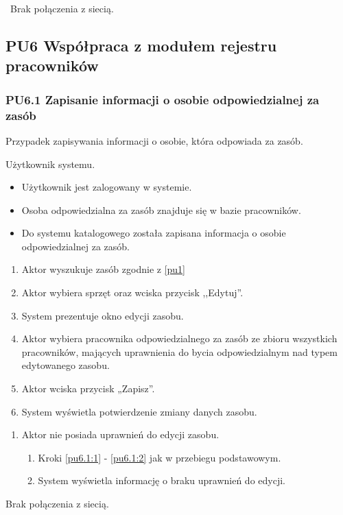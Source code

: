 \
Brak połączenia z siecią.


\subsection{PU6 Współpraca z modułem rejestru pracowników} \label{pu6}
\subsubsection{PU6.1 Zapisanie informacji o osobie odpowiedzialnej za zasób}
\myparagraph{Opis}
Przypadek zapisywania informacji o osobie, która odpowiada za zasób.

Użytkownik systemu.

\begin{itemize}
\item Użytkownik jest zalogowany w systemie.
\item Osoba odpowiedzialna za zasób znajduje się w bazie pracowników.
\end{itemize}

\begin{itemize}
\item Do systemu katalogowego została zapisana informacja o osobie odpowiedzialnej za zasób.
\end{itemize}

\begin{enumerate}
	\item \label{pu6.1:1} Aktor wyszukuje zasób zgodnie z \ref{pu1}
	\item \label{pu6.1:2} Aktor wybiera sprzęt oraz wciska przycisk ,,Edytuj''.
	\item System prezentuje okno edycji zasobu.
	\item Aktor wybiera pracownika odpowiedzialnego za zasób ze zbioru wszystkich pracowników, mających uprawnienia do bycia odpowiedzialnym nad typem edytowanego zasobu.
	\item Aktor wciska przycisk „Zapisz”.
	\item System wyświetla potwierdzenie zmiany danych zasobu.
\end{enumerate}

\begin{enumerate}
	\item Aktor nie posiada uprawnień do edycji zasobu.
	\begin{enumerate}[label*=\arabic*.]
		\item Kroki \ref{pu6.1:1} - \ref{pu6.1:2} jak w przebiegu podstawowym.
		\item System wyświetla informację o braku uprawnień do edycji.
	\end{enumerate}
\end{enumerate}
Brak połączenia z siecią.

